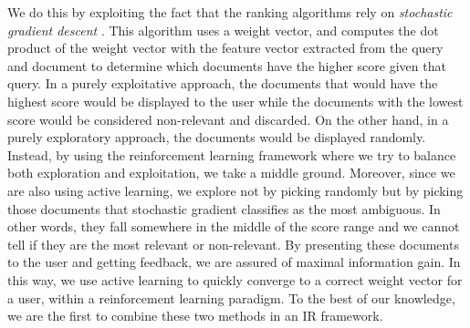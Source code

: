 \documentclass{acm_proc_article-sp}
\begin{document}
We do this by exploiting the fact that the ranking algorithms rely on \emph{stochastic gradient descent} \cite{stochastic}. This algorithm uses a weight vector, and computes the dot product of the weight vector with the feature vector extracted from the query and document to determine which documents have the higher score given that query. In a purely exploitative approach, the documents that would have the highest score would be displayed to the user while the documents with the lowest score would be considered non-relevant and discarded. On the other hand, in a purely exploratory approach, the documents would be displayed randomly. Instead, by using the reinforcement learning framework where we try to balance both exploration and exploitation, we take a middle ground. Moreover, since we are also using active learning, we explore not by picking randomly but by picking those documents that stochastic gradient classifies as the most ambiguous. In other words, they fall somewhere in the middle of the score range and we cannot tell if they are the most relevant or non-relevant. By presenting these documents to the user and getting feedback, we are assured of maximal information gain. In this way, we use active learning to quickly converge to a correct weight vector for a user, within a reinforcement learning paradigm. To the best of our knowledge, we are the first to combine these two methods in an IR framework. 
\end{document}
